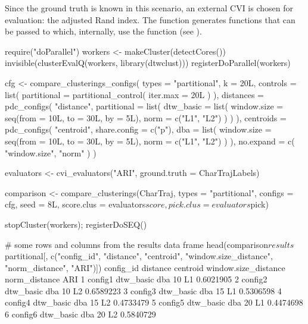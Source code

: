 Since the ground truth is known in this scenario,
an external CVI is chosen for evaluation:
the adjusted Rand index.
The  function generates functions that can be passed to  which, internally, use the  function
(see ).

\begin{example}
require("doParallel")
workers <- makeCluster(detectCores())
invisible(clusterEvalQ(workers, library(dtwclust)))
registerDoParallel(workers)

cfg <- compare_clusterings_configs(
    types = "partitional",
    k = 20L,
    controls = list(
        partitional = partitional_control(
            iter.max = 20L
        )
    ),
    distances = pdc_configs(
        "distance",
        partitional = list(
            dtw_basic = list(
                window.size = seq(from = 10L, to = 30L, by = 5L),
                norm = c("L1", "L2")
            )
        )
    ),
    centroids = pdc_configs(
        "centroid",
        share.config = c("p"),
        dba = list(
            window.size = seq(from = 10L, to = 30L, by = 5L),
            norm = c("L1", "L2")
        )
    ),
    no.expand = c(
        "window.size",
        "norm"
    )
)

evaluators <- cvi_evaluators("ARI", ground.truth = CharTrajLabels)

comparison <- compare_clusterings(CharTraj, types = "partitional",
                                  configs = cfg, seed = 8L,
                                  score.clus = evaluators$score,
                                  pick.clus = evaluators$pick)

stopCluster(workers); registerDoSEQ()

# some rows and columns from the results data frame
head(comparison$results$partitional[, c("config_id", "distance", "centroid",
                                        "window.size_distance", "norm_distance",
                                        "ARI")])
  config_id  distance centroid window.size_distance norm_distance       ARI
1   config1 dtw_basic      dba                   10            L1 0.6021905
2   config2 dtw_basic      dba                   10            L2 0.6589223
3   config3 dtw_basic      dba                   15            L1 0.5306598
4   config4 dtw_basic      dba                   15            L2 0.4733479
5   config5 dtw_basic      dba                   20            L1 0.4474698
6   config6 dtw_basic      dba                   20            L2 0.5840729
\end{example}

